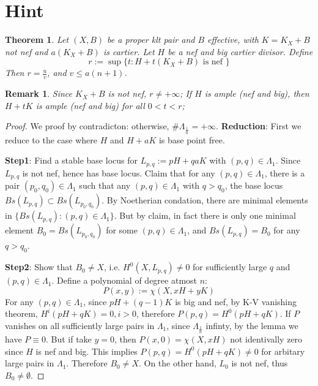 \documentclass{article}
\newtheorem{thm}[defn]{Theorem}
\newtheorem{rmk}[defn]{Remark}
\begin{document}
\section{Hint}
\begin{thm}
	Let $ (X,B) $ be a proper klt pair and $ B $ effective, with $ K=K_X+B $ not nef and $ a(K_X+B) $ is cartier.  Let $ H $ be a nef and big cartier divisor. Define 
	$$ r:=\sup \{t: H+t(K_X+B) \text{ is nef }\} $$
	Then $ r=\frac{u}{v} $, and $ v\leqslant a(n+1) $.
\end{thm}
\begin{rmk}
	Since $ K_X+B $ is not nef, $ r\neq +\infty $; If $ H $ is ample (nef and big), then $ H+tK $ is ample (nef and big) for all $ 0<t<r $;
\end{rmk}
\begin{proof}
	We proof by contradicton: otherwise, $\# \Lambda_{\frac{1}{n}}=+\infty $. \textbf{Reduction}: First we reduce to the case where  $ H $ and $ H+aK $ is base point free.
	
	\textbf{Step1}: Find a stable base locus for $ L_{p,q}:=pH+qaK $ with $ (p,q)\in \Lambda_1 $. Since $ L_{p,q} $ is  not nef, hence has base locus. Claim that for any $ (p,q)\in \Lambda_1 $, there is  a pair $ (p_0,q_0)\in \Lambda_1 $ such that any $ (p,q)\in \Lambda_1$ with $ q>q_0 $, the base locus $ Bs(L_{p,q})\subset Bs(L_{p_0,q_0}) $. By Noetherian condation, there are minimal elements in $ \{Bs(L_{p,q}):(p,q)\in \Lambda_1\} $. But by claim, in fact there is only one minimal element $ B_0=Bs(L_{p_0,q_0}) $ for some $ (p,q)\in \Lambda_1 $, and $ Bs(L_{p,q})=B_0 $ for any $ q>q_0 $.
	
	\textbf{Step2}: Show that $ B_0\neq X $, i.e. $ H^0(X, L_{p,q})\neq 0 $  for sufficiently large $ q $ and $ (p,q)\in \Lambda_1 $. Define a polynomial of degree atmost $ n $:
	$$ P(x,y):=\chi (X,xH+yK) $$
	For any $ (p,q)\in \Lambda_1 $, since $ pH+(q-1)K $ is big and nef, by K-V vanishing theorem, $ H^i(pH+qK)=0, i>0 $, therefore $ P(p,q)=H^0(pH+qK) $. If $ P $ vanishes on all sufficiently large pairs in $ \Lambda_1 $, since $ \Lambda_{\frac{1}{n}} $ infinty, by the lemma we have $ P\equiv 0 $. But if take $ y=0 $, then $ P(x,0)=\chi (X,xH) $ not identivally zero since $ H $ is nef and big. This implies $ P(p,q)=H^0(pH+qK)\neq 0 $ for arbitary large pairs in $ \Lambda_1$. Therefore $ B_0\neq X $. On the other hand, $ L_0 $ is not nef, thus $ B_0\neq \emptyset $.
	

\end{proof}
\end{document}
